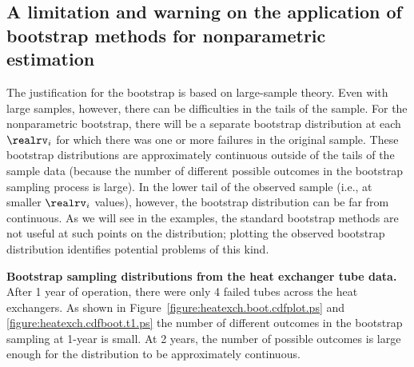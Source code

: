 \subsection{A limitation and warning on the application of
bootstrap methods for nonparametric estimation}
\label{section:limitation.nonpar.boot.dist}

The justification for the bootstrap is based on large-sample
theory. Even with large samples, however, there can be difficulties
in the tails of the sample.  For the nonparametric bootstrap, there
will be a separate bootstrap distribution at each $\realrv_{i}$ for
which there was one or more failures in the original sample.  These
bootstrap distributions are approximately continuous outside of the
tails of the sample data (because the number of different possible
outcomes in the bootstrap sampling process is large). In the lower
tail of the observed sample (i.e., at smaller $\realrv_{i}$ values),
however, the bootstrap distribution can be far from continuous. As
we will see in the examples, the standard bootstrap methods are not
useful at such points on the distribution; plotting the observed
bootstrap distribution identifies potential problems of this kind.

\begin{example}
\label{example:heatex.boot.sample.dist}
{\bf Bootstrap sampling distributions from the heat exchanger tube data.}
After 1 year of operation, there were only 4 failed tubes across the
heat exchangers. As shown in
Figure~\ref{figure:heatexch.boot.cdfplot.ps} and
\ref{figure:heatexch.cdfboot.t1.ps} the number of different outcomes
in the bootstrap sampling at 1-year is small.  At 2 years, the number
of possible outcomes is large enough for the distribution to be
approximately continuous.
\end{example}
 
